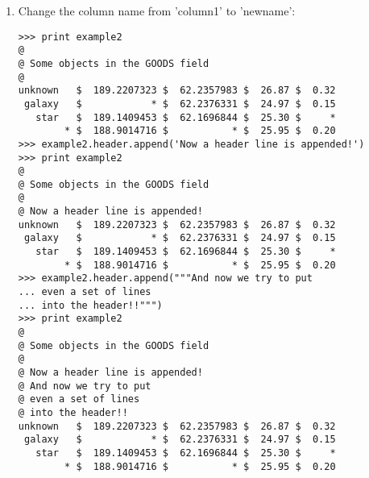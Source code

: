 \begin{enumerate}
\item Change the column name from 'column1' to 'newname':
\begin{small}
\begin{verbatim}
>>> print example2
@
@ Some objects in the GOODS field
@
unknown   $  189.2207323 $  62.2357983 $  26.87 $  0.32
 galaxy   $            * $  62.2376331 $  24.97 $  0.15
   star   $  189.1409453 $  62.1696844 $  25.30 $     *
        * $  188.9014716 $           * $  25.95 $  0.20
>>> example2.header.append('Now a header line is appended!')
>>> print example2
@
@ Some objects in the GOODS field
@
@ Now a header line is appended!
unknown   $  189.2207323 $  62.2357983 $  26.87 $  0.32
 galaxy   $            * $  62.2376331 $  24.97 $  0.15
   star   $  189.1409453 $  62.1696844 $  25.30 $     *
        * $  188.9014716 $           * $  25.95 $  0.20
>>> example2.header.append("""And now we try to put
... even a set of lines
... into the header!!""")
>>> print example2
@
@ Some objects in the GOODS field
@
@ Now a header line is appended!
@ And now we try to put
@ even a set of lines
@ into the header!!
unknown   $  189.2207323 $  62.2357983 $  26.87 $  0.32
 galaxy   $            * $  62.2376331 $  24.97 $  0.15
   star   $  189.1409453 $  62.1696844 $  25.30 $     *
        * $  188.9014716 $           * $  25.95 $  0.20
\end{verbatim}
\end{small}
\end{enumerate}
